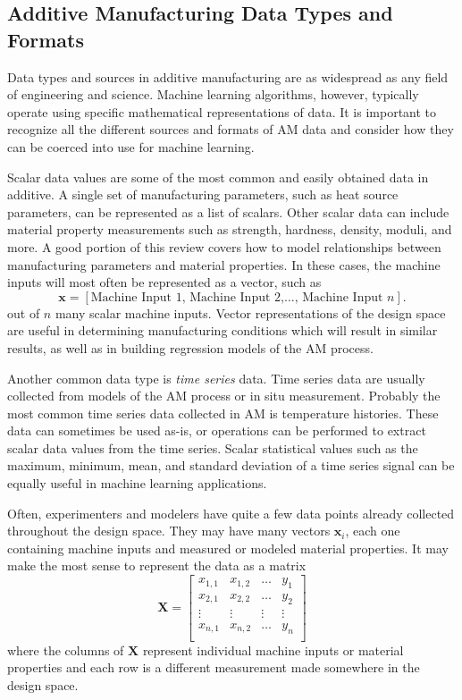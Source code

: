 \subsection{Additive Manufacturing Data Types and Formats}
Data types and sources in additive manufacturing are as widespread as any field of engineering and science. Machine learning algorithms, however, typically operate using specific mathematical representations of data. It is important to recognize all the different sources and formats of AM data and consider how they can be coerced into use for machine learning. 

Scalar data values are some of the most common and easily obtained data in additive. A single set of manufacturing parameters, such as heat source parameters, can be represented as a list of scalars. Other scalar data can include material property measurements such as strength, hardness, density, moduli, and more. A good portion of this review covers how to model relationships between manufacturing parameters and material properties. In these cases, the machine inputs will most often be represented as a vector, such as
\begin{equation}
	\mathbf{x} = \left[\text{Machine Input 1, Machine Input 2,} \hdots \text{, Machine Input } n \right].
	\label{vector}
\end{equation}
out of $n$ many scalar machine inputs. Vector representations of the design space are useful in determining manufacturing conditions which will result in similar results, as well as in building regression models of the AM process.

Another common data type is \textit{time series} data. Time series data are usually collected from models of the AM process or in situ measurement. Probably the most common time series data collected in AM is temperature histories. These data can sometimes be used as-is, or operations can be performed to extract scalar data values from the time series. Scalar statistical values such as the maximum, minimum, mean, and standard deviation of a time series signal can be equally useful in machine learning applications.

Often, experimenters and modelers have quite a few data points already collected throughout the design space. They may have many vectors $\mathbf{x}_i$, each one containing machine inputs and measured or modeled material properties. It may make the most sense to represent the data as a matrix 
\begin{equation}
	\mathbf{X} = \begin{bmatrix} x_{1,1} & x_{1,2} & \hdots & y_1 \\
						x_{2,1} & x_{2,2} & \hdots & y_2 \\
						\vdots & \vdots & \vdots & \vdots \\
						x_{n,1} & x_{n,2} & \hdots & y_n \\
				\end{bmatrix}
	\label{matrix}
\end{equation}
where the columns of $\mathbf{X}$ represent individual machine inputs or material properties and each row is a different measurement made somewhere in the design space. 

